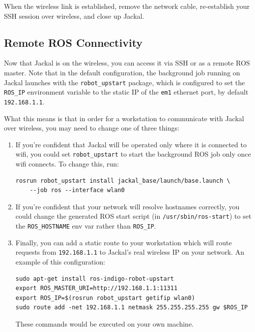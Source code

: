 \documentclass[]{clearpath-manual}
\begin{document}
When the wireless link is established, remove the network cable, re-establish your SSH
session over wireless, and close up Jackal.

\subsection{Remote ROS Connectivity}\label{remote}

Now that Jackal is on the wireless, you can access it via SSH or as a remote ROS master.
Note that in the default configuration, the background job running on Jackal launches with the 
\lstinline{robot_upstart} package, which is configured to set the \lstinline{ROS_IP}
environment variable to the static IP of the \lstinline{em1} ethernet port, by default
\lstinline{192.168.1.1}.

What this means is that in order for a workstation to communicate with Jackal over
wireless, you may need to change one of three things:

\begin{enumerate}
\item If you're confident that Jackal will be operated only where it is connected
to wifi, you could set \lstinline{robot_upstart} to start the background ROS job only
once wifi connects. To change this, run:
\begin{lstlisting}
rosrun robot_upstart install jackal_base/launch/base.launch \
    --job ros --interface wlan0
\end{lstlisting}

\item If you're confident that your network will resolve hostnames correctly, you could
change the generated ROS start script (in \lstinline{/usr/sbin/ros-start}) to set the
\lstinline{ROS_HOSTNAME} env var rather than \lstinline{ROS_IP}.

\item Finally, you can add a static route to your workstation which will route requests
from \lstinline{192.168.1.1} to Jackal's real wireless IP on your network. An example of
this configuration:
\begin{lstlisting}
sudo apt-get install ros-indigo-robot-upstart
export ROS_MASTER_URI=http://192.168.1.1:11311
export ROS_IP=$(rosrun robot_upstart getifip wlan0)
sudo route add -net 192.168.1.1 netmask 255.255.255.255 gw $ROS_IP
\end{lstlisting}
These commands would be executed on your own machine.
\end{enumerate}
\end{document}
